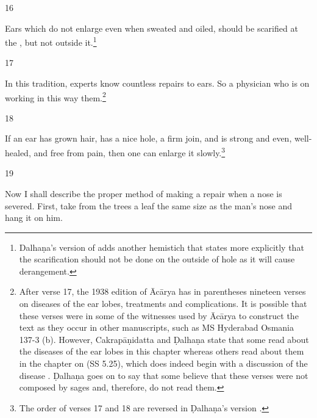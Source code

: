 \begin{translation}
\item[16]
        \begin{sloka}
Ears which do not enlarge even when sweated and oiled,  should be scarified  at the
, but not outside it.\footnote{Dalhaṇa's version of
     adds another hemistich that states more explicitly that the
    scarification should not be done on the outside of hole as it will cause
    derangement.}
        \end{sloka}
    
\item[17]
          \begin{sloka}
    In this tradition, experts know countless repairs to ears.  So a 
    physician who is  on working in this way 
     them.\footnote{After verse 17, the 1938 edition of 
    Ācārya 
    \citep[80]{vulgate} has in parentheses nineteen verses on diseases of the ear lobes, 
    treatments and complications. It is possible that these verses were in some of the 
    witnesses used by Ācārya to construct the text as they occur in other manuscripts, such as  
    MS Hyderabad Osmania 137-3 (b). However, Cakrapāṇidatta \citep[132]{acar-1939} and 
    Ḍalhaṇa \citep[80]{vulgate} state that some read about the diseases of the ear lobes in 
    this chapter whereas others read about them in the chapter on 
     (SS 5.25), which does indeed begin with a 
    discussion of the disease .  Ḍalhaṇa goes on to say that some believe that 
    these verses were not composed by sages and, therefore, do not read them.}
        \end{sloka}
    
\item[18]
           \begin{sloka}
    If an ear has grown hair, has a nice hole, a firm join, and is strong and
    even, well-healed, and free from pain, then one can enlarge it slowly.\footnote{The order of verses 17 and 18 are reversed in Ḍalhaṇa's version \citep[80]{vulgate}.}
        \end{sloka}
    
\item[19]
    
   \begin{sloka}
        Now I shall describe the proper method of making a repair when a nose is severed.
    First, take from the trees a leaf the same size as the man's nose and hang it
    on him. 
   \end{sloka}
    

\end{translation}
